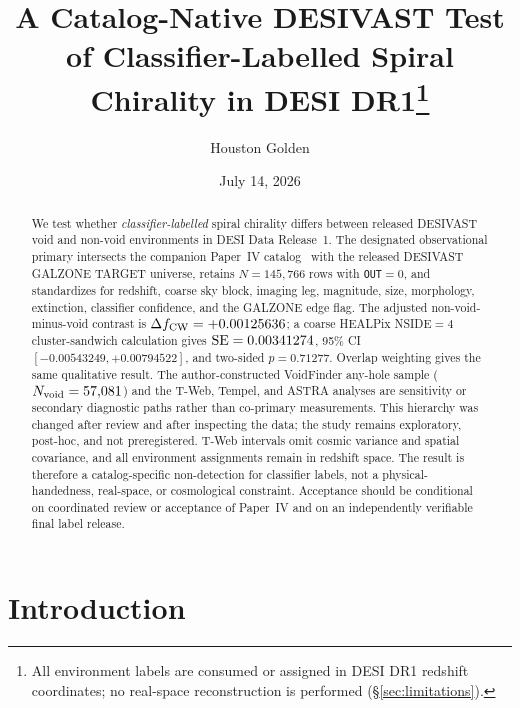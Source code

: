 \documentclass[aps,prd,twocolumn,superscriptaddress,showpacs,preprintnumbers,nofootinbib,longbibliography,floatfix]{revtex4-2}
\begin{document}
\title{A Catalog-Native DESIVAST Test of Classifier-Labelled Spiral Chirality in DESI DR1\protect\footnote{All environment labels are consumed or assigned in DESI DR1 redshift coordinates; no real-space reconstruction is performed (\S\ref{sec:limitations}).}}

\author{Houston Golden}

\date{July 14, 2026}

\begin{abstract}
We test whether \emph{classifier-labelled} spiral chirality differs
between released DESIVAST~\cite{DESIVAST2025} void and non-void
environments in DESI Data Release~1. The designated observational
primary intersects the companion Paper~IV catalog~\cite{golden_chirality_2026}
with the released DESIVAST GALZONE TARGET universe, retains
$N=145{,}766$ rows with \texttt{OUT}$=0$, and standardizes for redshift,
coarse sky block, imaging leg, magnitude, size, morphology, extinction,
classifier confidence, and the GALZONE edge flag. The adjusted
non-void-minus-void contrast is
$\Delta f_{\rm CW}=+0.00125636$; a coarse HEALPix NSIDE$=4$
cluster-sandwich calculation gives ${\rm SE}=0.00341274$, 95\% CI
$[-0.00543249,+0.00794522]$, and two-sided $p=0.71277$. Overlap
weighting gives the same qualitative result. The author-constructed
VoidFinder any-hole sample ($N_{\rm void}=57{,}081$) and the T-Web,
Tempel, and ASTRA analyses are sensitivity or secondary diagnostic
paths rather than co-primary measurements. This hierarchy was changed
after review and after inspecting the data; the study remains
exploratory, post-hoc, and not preregistered. T-Web intervals omit
cosmic variance and spatial covariance, and all environment assignments
remain in redshift space. The result is therefore a catalog-specific
non-detection for classifier labels, not a physical-handedness,
real-space, or cosmological constraint. Acceptance should be conditional
on coordinated review or acceptance of Paper~IV and on an independently
verifiable final label release.
\end{abstract}
\maketitle

\section{Introduction}\label{sec:intro}
\end{document}
